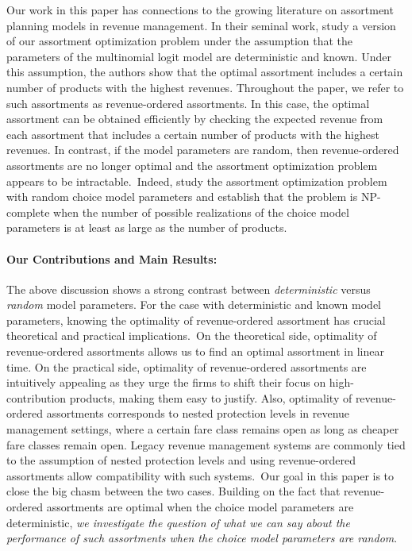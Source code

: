 Our work in this paper has connections to the growing literature on assortment planning models in revenue management. In their seminal work, \cite{TalluriVanRyzin:2004} study a version of our assortment optimization problem under the assumption that the parameters of the multinomial logit model are deterministic and known. Under this assumption, the authors show that the optimal assortment includes a certain number of products with the highest revenues. Throughout the paper, we refer to such assortments as revenue-ordered assortments. In this case, the optimal assortment can be obtained efficiently by checking the expected revenue from each assortment that includes a certain number of products with the highest revenues. In contrast, if the  model parameters are random, then \mbox{revenue-ordered} assortments are no longer optimal and the assortment optimization problem appears to be intractable.~Indeed, \cite{BrontMendezVulcano:2009} study the assortment optimization problem with random choice model parameters and establish that the problem is NP-complete when the number of possible realizations of the choice model parameters is at least as large as the number of products.

\paragraph{Our Contributions and Main Results:} The above discussion shows a strong contrast between {\em deterministic} versus {\em random}
model parameters. For the case with deterministic and known  model parameters, knowing the optimality of revenue-ordered assortment has crucial theoretical and practical implications.~On the theoretical side, optimality of revenue-ordered assortments allows us to find an optimal assortment in linear time. On the practical side, optimality of revenue-ordered assortments are intuitively appealing as they urge the firms to shift their focus on high-contribution products, making them easy to justify. Also, optimality of revenue-ordered assortments corresponds to nested protection levels in revenue management settings, where a certain fare class remains open as long as cheaper fare classes remain open. Legacy revenue management systems are commonly tied to the assumption of nested protection levels and using revenue-ordered assortments allow compatibility with such systems.~Our goal in this paper is to close the big chasm between the two cases. Building on the fact that revenue-ordered assortments are optimal when the choice model parameters are deterministic, {\em we investigate the question of what we can say about the performance of such assortments when the choice model parameters are random}.



